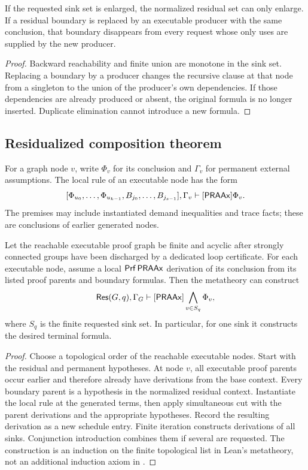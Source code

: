 \begin{lemma}\label{lem:residual-monotonicity}
If the requested sink set is enlarged, the normalized residual set can only enlarge.  If a residual boundary is replaced by an executable producer with the same conclusion, that boundary disappears from every request whose only uses are supplied by the new producer.
\end{lemma}

\begin{proof}
Backward reachability and finite union are monotone in the sink set.  Replacing a boundary by a producer changes the recursive clause at that node from a singleton to the union of the producer's own dependencies.  If those dependencies are already produced or absent, the original formula is no longer inserted.  Duplicate elimination cannot introduce a new formula.
\end{proof}

\subsection{Residualized composition theorem}

For a graph node \(v\), write \(\Phi_v\) for its conclusion and \(\Gamma_v\) for permanent external assumptions.  The local rule of an executable node has the form
\[
   [\Phi_{u_0},\ldots,\Phi_{u_{k-1}},B_{j_0},\ldots,B_{j_{s-1}}],\Gamma_v
      \vdash[\mathsf{PRAAx}] \Phi_v.
\]
The premises may include instantiated demand inequalities and trace facts; these are conclusions of earlier generated nodes.

\begin{theorem}\label{thm:residual-compilation}
Let the reachable executable proof graph be finite and acyclic after strongly connected groups have been discharged by a dedicated loop certificate.  For each executable node, assume a local \(\mathsf{Prf}\,\mathsf{PRAAx}\) derivation of its conclusion from its listed proof parents and boundary formulas.  Then the metatheory can construct
\[
  \mathsf{Res}(G,q),\Gamma_G\vdash[\mathsf{PRAAx}]\bigwedge_{v\in S_q}\Phi_v,
\]
where \(S_q\) is the finite requested sink set.  In particular, for one sink it constructs the desired terminal formula.
\end{theorem}

\begin{proof}
Choose a topological order of the reachable executable nodes.  Start with the residual and permanent hypotheses.  At node \(v\), all executable proof parents occur earlier and therefore already have derivations from the base context.  Every boundary parent is a hypothesis in the normalized residual context.  Instantiate the local rule at the generated terms, then apply simultaneous cut with the parent derivations and the appropriate hypotheses.  Record the resulting derivation as a new schedule entry.  Finite iteration constructs derivations of all sinks.  Conjunction introduction combines them if several are requested.  The construction is an induction on the finite topological list in Lean's metatheory, not an additional induction axiom in \iPRA.
\end{proof}

